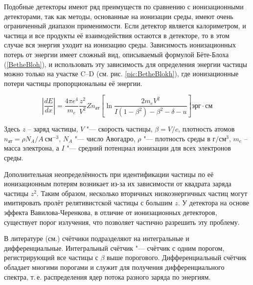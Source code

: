 \documentclass[12pt,a4paper]{report} %
\begin{document}
Подобные детекторы имеют ряд преимуществ по сравнению с ионизационными детекторами, так как методы, основанные на ионизации среды, имеют очень ограниченный диапазон применимости. Если детектор является калориметром, и частица и все продукты её взаимодействия остаются в детекторе, то в этом случае вся энергия уходит на ионизацию среды. Зависимость ионизационных потерь от энергии имеет сложный вид, описываемый формулой Бёте-Блоха (\ref{BetheBloh}), и использовать эту зависимость для определения энергии частицы можно только на участке C--D (см. рис. \ref{pic:BetheBlokh}), где ионизационные потери частицы пропорциональны её энергии.

\begin{equation}\label{BetheBloh}
\left| \frac{dE}{dx}\right| = \frac{4\pi e^4}{m_e}\frac{z^2}{V^2}Zn_{ат}
\left[
	\ln \frac{2m_eV^2}{I(1-\beta^2)-\beta^2-\delta-u} 
\right] эрг\cdot см
\end{equation}

Здесь $z$ -- заряд частицы, $V$ "--- скорость частицы, $\beta = V / c$, плотность атомов $n_{ат}=\rho N_A/A~см^{-3}$, $N_A$ "--- число Авогадро, $\rho$ "--- плотность среды в $г/см^3$, $m_e$ -- масса электрона, а $I$ "--- средний потенциал ионизации для всех электронов среды. 

Дополнительная неопределённость при идентификации частицы по её ионизационным потерям возникает из-за их зависимости от квадрата заряда частицы $z^2$. Таким образом, несколько вторичных низкоэнергичных частиц могут имитировать пролёт релятивистской частицы с большим $z$. У детектора на основе эффекта Вавилова-Черенкова, в отличие от ионизационных детекторов, существует порог излучения, что позволяет частично разрешить эту проблему. 

В литературе (см.\cite{Ginzburg}) счётчики подразделяют на интегральные и дифференциальные. Интегральный счётчик "--- счётчик с одним порогом, регистрирующий все частицы с $\beta$ выше порогового. Дифференциальный счётчик обладает многими порогами и служит для получения дифференциального спектра, т.\,е. распределения ядер потока разного заряда по энергиям.
\end{document}
